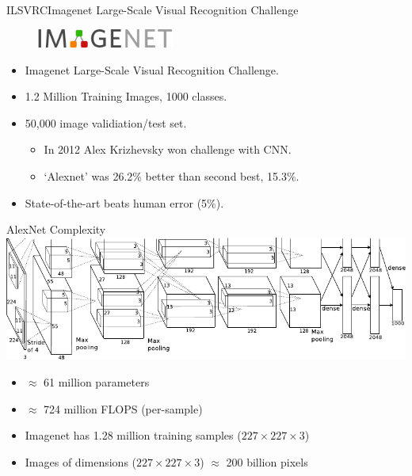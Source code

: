 \documentclass[t,xcolor=dvipsnames]{beamer}
\begin{document}
\begin{frame}{ILSVRC}{Imagenet Large-Scale Visual Recognition Challenge}

\begin{figure}
    \includegraphics[width=0.4\textwidth]{imagenetlogo}
\end{figure}
\begin{itemize}
    \item Imagenet Large-Scale Visual Recognition Challenge.
    \item 1.2 Million Training Images, 1000 classes.
    \item 50,000 image validiation/test set.
    \begin{itemize}
        \item In 2012 Alex Krizhevsky won challenge with CNN.
        \item `Alexnet' was 26.2\% better than second best, 15.3\%.
    \end{itemize}
    \item State-of-the-art beats human error (5\%).
\end{itemize}    
\end{frame}


\begin{frame}{AlexNet Complexity}
\includegraphics[width=\columnwidth]{alexnet}
\begin{itemize}
\item $\approx$ 61 million parameters %
\item $\approx$ 724 million FLOPS (per-sample) %
\item Imagenet has 1.28 million training samples ($227 \times 227 \times 3$) %
\item Images of dimensions  ($227 \times 227 \times 3$) $\approx$ 200 billion pixels %
\end{itemize}
\end{frame}
\end{document}
